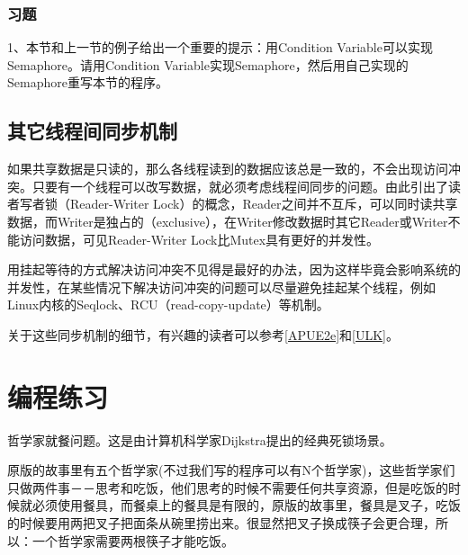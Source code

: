 
\subsubsection*{习题}
%


1、本节和上一节的例子给出一个重要的提示：用Condition Variable可以实现Semaphore。请用Condition Variable实现Semaphore，然后用自己实现的Semaphore重写本节的程序。


\subsection{其它线程间同步机制}
%


如果共享数据是只读的，那么各线程读到的数据应该总是一致的，不会出现访问冲突。只要有一个线程可以改写数据，就必须考虑线程间同步的问题。由此引出了读者写者锁（Reader-Writer Lock）的概念，Reader之间并不互斥，可以同时读共享数据，而Writer是独占的（exclusive），在Writer修改数据时其它Reader或Writer不能访问数据，可见Reader-Writer Lock比Mutex具有更好的并发性。



用挂起等待的方式解决访问冲突不见得是最好的办法，因为这样毕竟会影响系统的并发性，在某些情况下解决访问冲突的问题可以尽量避免挂起某个线程，例如Linux内核的Seqlock、RCU（read-copy-update）等机制。



关于这些同步机制的细节，有兴趣的读者可以参考\hyperlink{db.bi01.bibli.apue}{[APUE2e]}和\hyperlink{db.bi01.bibli.ulk}{[ULK]}。




\section{编程练习}
%
哲学家就餐问题。这是由计算机科学家Dijkstra提出的经典死锁场景。



原版的故事里有五个哲学家(不过我们写的程序可以有N个哲学家)，这些哲学家们只做两件事－－思考和吃饭，他们思考的时候不需要任何共享资源，但是吃饭的时候就必须使用餐具，而餐桌上的餐具是有限的，原版的故事里，餐具是叉子，吃饭的时候要用两把叉子把面条从碗里捞出来。很显然把叉子换成筷子会更合理，所以：一个哲学家需要两根筷子才能吃饭。



